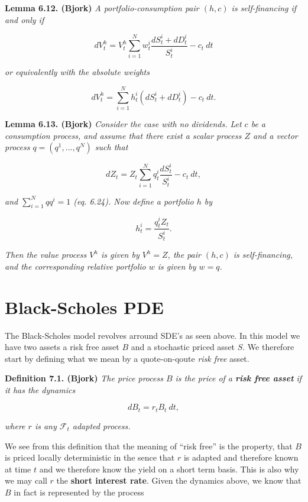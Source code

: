 \documentclass[
]{book}
\begin{document}
\textbf{Lemma 6.12. (Bjork)} \emph{A portfolio-consumption pair \((h,c)\) is self-financing if and only if}

\[
dV_t^h=V_t^h\sum_{i=1}^N w_t^i\frac{dS_t^i+dD_t^i}{S_t^i}-c_t\ dt\tag{6.22}
\]

\emph{or equivalently with the absolute weights}

\[
dV_t^h=\sum_{i=1}^N h_t^i(dS_t^i+dD_t^i)-c_t\ dt.
\]

\textbf{Lemma 6.13. (Bjork)} \emph{Consider the case with no dividends. Let \(c\) be a consumption process, and assume that there exist a scalar process \(Z\) and a vector process \(q=(q^1,...,q^N)\) such that}

\[
dZ_t=Z_t\sum_{i=1}^N q_t^i\frac{dS_t^i}{S_t^i}-c_t\ dt,\tag{6.23}
\]

\emph{and \(\sum_{i=1}^Nqq^i=1\) (eq. 6.24). Now define a portfolio \(h\) by}

\[
h_t^i=\frac{q_t^iZ_t}{S_t^i}.\tag{6.25}
\]

\emph{Then the value process \(V^h\) is given by \(V^h=Z\), the pair \((h,c)\) is self-financing, and the corresponding relative portfolio \(w\) is given by \(w=q\).}

\newpage

\hypertarget{black-scholes-pde}{%
\section{Black-Scholes PDE}\label{black-scholes-pde}}

The Black-Scholes model revolves arround SDE's as seen above. In this model we have two assets a risk free asset \(B\) and a stochastic priced asset \(S\). We therefore start by defining what we mean by a quote-on-qoute \emph{risk free} asset.

\textbf{Definition 7.1. (Bjork)} \emph{The price process \(B\) is the price of a \textbf{risk free asset} if it has the dynamics}

\[
dB_t=r_t B_t\ dt,\tag{7.1}
\]

\emph{where \(r\) is any \(\mathcal{F}_t\) adapted process.}

We see from this definition that the meaning of ``risk free'' is the property, that \(B\) is priced locally deterministic in the sence that \(r\) is adapted and therefore known at time \(t\) and we therefore know the yield on a short term basis. This is also why we may call \(r\) the \textbf{short interest rate}. Given the dynamics above, we know that \(B\) in fact is represented by the process
\end{document}
